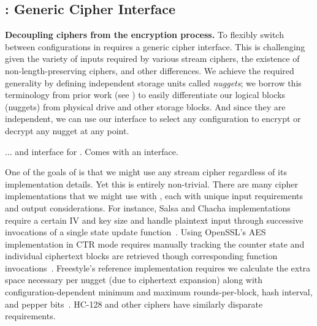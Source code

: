 \subsection{\sysB: Generic Cipher Interface}\label{subsec:des-crypts}

\textbf{Decoupling ciphers from the encryption process.} To flexibly switch
between configurations in \sys requires a generic cipher interface. This is
challenging given the variety of inputs required by various stream ciphers, the
existence of non-length-preserving ciphers, and other differences. We achieve
the required generality by defining independent storage units called
\emph{nuggets}; we borrow this terminology from prior work (see
\cite{StrongBox}) to easily differentiate our logical blocks (nuggets) from
physical drive and other storage blocks. And since they are independent, we can
use our interface to select any configuration to encrypt or decrypt any nugget
at any point.

... and interface for \sysB. Comes with an interface.


One of the goals of \sys is that we might use any stream cipher regardless of
its implementation details. Yet this is entirely non-trivial. There are many
cipher implementations that we might use with \sys, each with unique input
requirements and output considerations. For instance, Salsa and Chacha
implementations require a certain IV and key size and handle plaintext input
through successive invocations of a single state update
function~\cite{Floodyberry}. Using OpenSSL's AES implementation in CTR mode
requires manually tracking the counter state and individual ciphertext blocks
are retrieved though corresponding function invocations~\cite{OpenSSL}.
Freestyle's reference implementation requires we calculate the extra space
necessary per nugget (due to ciphertext expansion) along with
configuration-dependent minimum and maximum rounds-per-block, hash interval, and
pepper bits~\cite{Freestyle}. HC-128 and other ciphers have similarly disparate
requirements.

